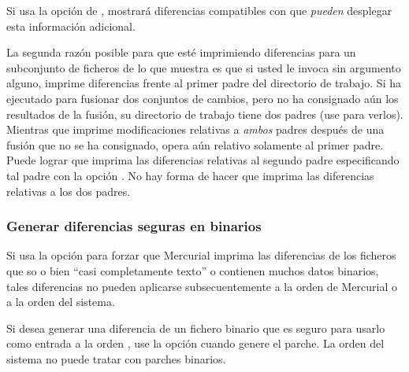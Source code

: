 Si usa la opción  de , mostrará
diferencias compatibles con  que \emph{pueden} desplegar
esta información adicional.

La segunda razón posible para que  esté imprimiendo
diferencias para un subconjunto de ficheros de lo que muestra
 es que si usted le invoca sin argumento alguno,
 imprime diferencias frente al primer padre del directorio
de trabajo.  Si ha ejecutado  para fusionar dos conjuntos
de cambios, pero no ha consignado aún los resultados de la fusión,  su
directorio de trabajo tiene dos padres (use  para
verlos).  Mientras que  imprime modificaciones relativas
a \emph{ambos} padres después de una fusión que no se ha consignado,
 opera aún relativo solamente al primer padre.  Puede
lograr que imprima las diferencias relativas al segundo padre
especificando tal padre con la opción .  No hay forma
de hacer que imprima las diferencias relativas a los dos padres.

\subsubsection{Generar diferencias seguras en binarios}

Si usa la opción  para forzar que Mercurial imprima
las diferencias de los ficheros que so o bien ``casi completamente
texto'' o contienen muchos datos binarios, tales diferencias no pueden
aplicarse subsecuentemente a la orden  de Mercurial o a
la orden  del sistema.

Si desea generar una diferencia de un fichero binario que es seguro
para usarlo como entrada a la orden , use la opción
 cuando genere el parche.  La orden 
del sistema no puede tratar con parches binarios.

